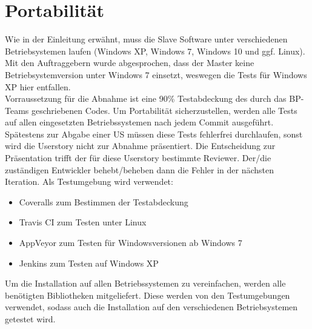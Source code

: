 \documentclass[accentcolor=tud9c,12pt,paper=a4]{tudreport}
\begin{document}
		\section{Portabilität}
		Wie in der Einleitung erwähnt, muss die Slave Software unter verschiedenen 
		Betriebsystemen laufen (Windows XP, Windows 7, Windows 10 und ggf. Linux).
		Mit den Auftraggebern wurde abgesprochen, dass der Master keine 
		Betriebsystemversion unter Windows 7 einsetzt, weswegen die Tests für Windows
		XP hier entfallen.
		\\[5pt]
		Vorraussetzung für die Abnahme ist eine 90\% Testabdeckung des durch das
		BP-Teams geschriebenen Codes.
		Um Portabilität sicherzustellen, werden alle Tests auf allen eingesetzten
		Betriebssystemen nach jedem Commit ausgeführt. Spätestens zur Abgabe einer
		US müssen diese Tests fehlerfrei durchlaufen, sonst wird die Userstory nicht
		zur Abnahme präsentiert. Die Entscheidung zur Präsentation trifft der für diese
		Userstory bestimmte Reviewer. Der/die zuständigen Entwickler behebt/beheben dann die Fehler
		in der nächsten Iteration.
		Als Testumgebung wird verwendet:
		\begin{itemize}
			\item Coveralls zum Bestimmen der Testabdeckung
			\item Travis CI zum Testen unter Linux
			\item AppVeyor zum Testen für Windowsversionen ab Windows 7
			\item Jenkins zum Testen auf Windows XP
		\end{itemize}
		Um die Installation auf allen Betriebssystemen zu vereinfachen, werden alle benötigten
		Bibliotheken mitgeliefert. Diese werden von den Testumgebungen verwendet, sodass
		auch die Installation auf den verschiedenen Betriebsystemen getestet wird.
\end{document}
